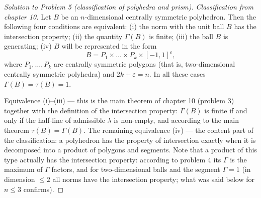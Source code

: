 \documentclass[a4paper,12pt]{report}
\begin{document}
\begin{proof}[Solution to Problem \textup{5} \textup{(}classification of polyhedra and prism\textup{)}]

\textit{Classification from chapter \textup{10}.} Let $B$ be an $n$-dimensional centrally symmetric polyhedron. Then the following four conditions are equivalent\textup{:} \textup{(i)} the norm with the unit ball $B$ has the intersection property\textup{;} \textup{(}ii\textup{)} the quantity $\Gamma(B)$ is finite\textup{;} \textup{(}iii\textup{)} the ball $B$ is generating\textup{;} \textup{(}iv\textup{)} $B$ will be represented in the form
\[
B=P_1\times\dots\times P_k\times[-1,1]^{\varepsilon},
\]
where $P_1,\dots,P_k$ are centrally symmetric polygons \textup{(}that is, two-dimensional centrally symmetric polyhedra\textup{)} and $2k+\varepsilon=n$. In all these cases $\Gamma(B)=\tau(B)=1$.

Equivalence \textup{(i)}--\textup{(}iii\textup{)} --- this is the main theorem of chapter \textup{10} \textup{(}problem \textup{3}\textup{)} together with the definition of the intersection property\textup{:} $\Gamma(B)$ is finite if and only if the half-line of admissible $\lambda$ is non-empty, and according to the main theorem $\tau(B)=\Gamma(B)$. The remaining equivalence \textup{(}iv\textup{)} --- the content part of the classification\textup{:} a polyhedron has the property of intersection exactly when it is decomposed into a product of polygons and segments. Note that a product of this type actually has the intersection property\textup{:} according to problem \textup{4} its $\Gamma$ is the maximum of $\Gamma$ factors, and for two-dimensional balls and the segment $\Gamma=1$ \textup{(}in dimension $\le2$ all norms have the intersection property; what was said below for $n\le3$ confirms\textup{)}.


\end{proof}
\end{document}
